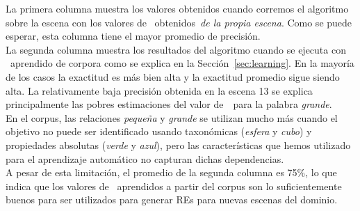 La primera columna muestra los valores obtenidos cuando corremos el algoritmo sobre la escena
con los valores de \puse\ obtenidos~\emph{de la propia escena}. Como se puede esperar,
esta columna tiene el mayor promedio de precisi\'on.\\


La segunda columna muestra los resultados del algoritmo cuando se ejecuta con \puse\ aprendido de
corpora como se explica en la Secci\'on~\ref{sec:learning}. En la mayor\'{i}a de los casos la exactitud
es m\'as bien alta y la exactitud promedio sigue siendo alta. La relativamente baja precisi\'on
obtenida en la escena 13 se explica principalmente las pobres estimaciones del valor de~\puse\ para la palabra \emph{grande}. \\

En el corpus, las relaciones \emph{peque\~na} y \emph{grande} se utilizan mucho m\'as cuando el objetivo no puede ser identificado usando taxon\'omicas (\emph{esfera} y \emph{cubo}) y propiedades absolutas (\emph{verde} y \emph{azul}), pero las caracter\'{i}sticas que hemos utilizado para el aprendizaje autom\'atico no capturan dichas dependencias.\\


%
%

A pesar de esta limitaci\'on, el promedio de la segunda columna es 75\%, lo que indica que los valores de \puse\ aprendidos a partir del corpus son lo suficientemente buenos para ser utilizados para generar REs para nuevas escenas del dominio.\\


